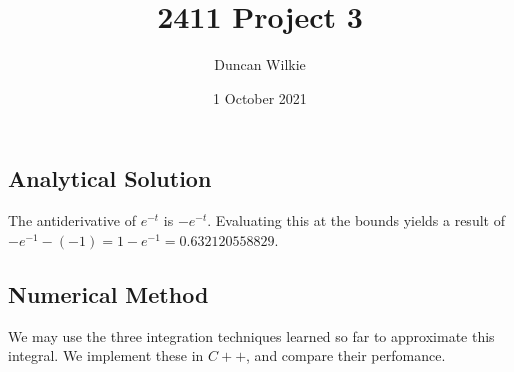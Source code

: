 \documentclass{article}
\title{2411 Project 3}
\author{Duncan Wilkie}
\date{1 October 2021}
\begin{document}
\maketitle

\section{}
\subsection{Analytical Solution}
The antiderivative of $e^{-t}$ is $-e^{-t}$. Evaluating this at the bounds yields a result of $-e^{-1} - (-1)=1-e^{-1}=0.632120558829$.
\subsection{Numerical Method}
We may use the three integration techniques learned so far to approximate this integral. We implement these in $C++$, and compare their perfomance.
\end{document}
